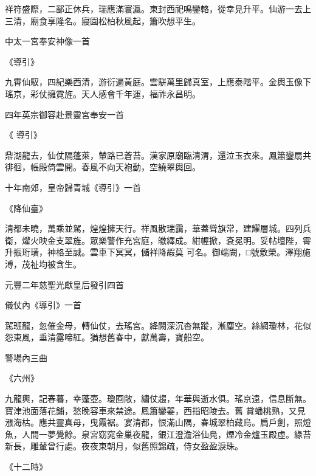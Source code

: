 \begin{pinyinscope}
 祥符盛際，二鄙正休兵，瑞應滿寰瀛。東封西祀鳴鑾輅，從幸見升平。仙游一去上三清，廟食享隆名。寢園松柏秋風起，簫吹想平生。



 中太一宮奉安神像一首



 《導引》



 九霄仙馭，四紀樂西清，游衍遍黃庭。雲駢萬里歸真室，上應泰階平。金輿玉像下瑤京，彩仗擁霓旌。天人感會千年運，福祚永昌明。



 四年英宗御容赴景靈宮奉安一首



 《
 導引》



 鼎湖龍去，仙仗隔蓬萊，輦路已蒼苔。漢家原廟臨清渭，還泣玉衣來。鳳簫鑾扇共徘徊，帳殿倚雲開。春風不向天袍動，空繞翠輿回。



 十年南郊，皇帝歸青城《導引》一首



 《降仙臺》



 清都未曉，萬乘並駕，煌煌擁天行。祥風散瑞靄，華蓋聳旗常，建耀層城。四列兵衛，爟火映金支翠旌。眾樂警作充宮庭，皦繹成。紺幄掀，袞冕明。妥帖壇陛，霄升振珩璜，神格至誠。雲車下冥冥，儲祥降嘏莫
 可名。御端闕，□號敷榮。澤翔施溥，茂祉均被含生。



 元豐二年慈聖光獻皇后發引四首



 儀仗內《導引》一首



 駕班龍，忽催金母，轉仙仗，去瑤宮。絳闕深沉杳無蹤，漸塵空。絲網瓊林，花似怨東風，垂清露啼紅。猶想舊春中，獻萬壽，寶船空。



 警場內三曲



 《六州》



 九龍輿，記春暮，幸蓬壺。瓊囿敞，繡仗趨，年華與逝水俱。瑤京遠，信息斷無。寶津池面落花鋪，愁晚容車來禁途。鳳簫鑾翣，西指昭陵去。舊
 賞蟠桃熟，又見漲海枯。應共靈真母，曳霞裾。宴清都，恨滿山隅，春城翠柏藏烏。扃戶劍，照燈魚，人間一夢覺餘。泉宮窈窕金巢夜龍，銀江澄澹浴仙鳧，煙冷金爐玉殿虛。綠苔新長，雕輦曾行處。夜夜東朝月，似舊照錦疏，侍女盈盈淚珠。



 《十二時》




\end{pinyinscope}
